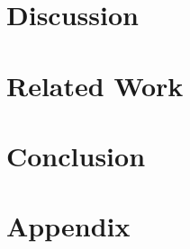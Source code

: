 \documentclass[thesis]{plai}
\begin{document}
\chapter{Discussion}
\label{chapter:discussion}

\chapter{Related Work}
\label{chapter:related-work}


\chapter{Conclusion}
\label{chapter:conclusion}







\chapter*{Appendix}
\label{chapter:appendix}



\end{document}
